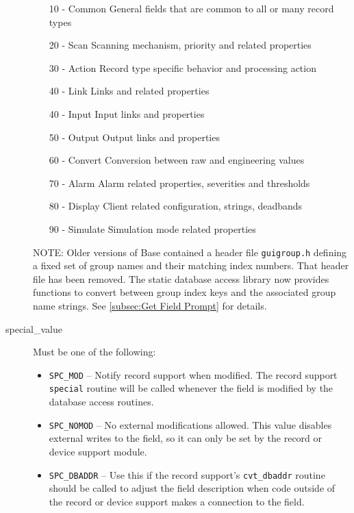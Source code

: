 \begin{description}
\begin{itemize}
\item [10 - Common] General fields that are common to all or many record types
\item [20 - Scan] Scanning mechanism, priority and related properties
\item [30 - Action] Record type specific behavior and processing action
\item [40 - Link] Links and related properties
\item [40 - Input] Input links and properties
\item [50 - Output] Output links and properties
\item [60 - Convert] Conversion between raw and engineering values
\item [70 - Alarm] Alarm related properties, severities and thresholds
\item [80 - Display] Client related configuration, strings, deadbands
\item [90 - Simulate] Simulation mode related properties
\end{itemize}

NOTE: Older versions of Base contained a header file \verb|guigroup.h| defining a fixed set of group names and their matching index numbers.
That header file has been removed.
The static database access library now provides functions to convert between
group index keys and the associated group name strings.
See \ref{subsec:Get Field Prompt} for details.

\item [special\_value] Must be one of the following:

\begin{itemize}
\item \verb|SPC_MOD| -- Notify record support when modified.
The record support \verb|special| routine will be called whenever the field is modified by the database access routines.

\item \verb|SPC_NOMOD| -- No external modifications allowed.
This value disables external writes to the field, so it can only be set by the record or device support module.

\item \verb|SPC_DBADDR| -- Use this if the record support's \verb|cvt_dbaddr| routine should be called to adjust the field description when code outside of the record or device support makes a connection to the field.


\end{itemize}
\end{description}
